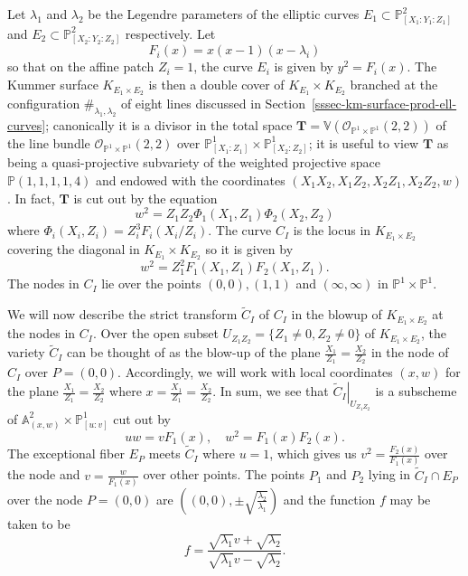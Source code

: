 \documentclass[11pt,a4paper]{article}
\begin{document}
Let $\lambda_1$ and $\lambda_2$ be the Legendre parameters of the elliptic curves $E_1 \subset \mathbb{P}^2_{[X_1:Y_1:Z_1]}$ and $E_2 \subset \mathbb{P}^2_{[X_2:Y_2:Z_2]}$ respectively. Let
\[F_i(x) = x (x - 1)(x- \lambda_i)\]
so that on the affine patch $Z_i = 1$, the curve $E_i$ is given by $y^2 = F_i(x)$. The Kummer surface $K_{E_1 \times E_2}$ is then a double cover of $K_{E_1} \times K_{E_2}$ branched at the configuration $\#_{\lambda_1, \lambda_2}$ of eight lines discussed in Section~\ref{sssec-km-surface-prod-ell-curves}; canonically it is a divisor in the total space $\mathbf{T} = \mathbb{V}(\mathcal{O}_{\mathbb{P}^1 \times \mathbb{P}^1}(2, 2))$ of the line bundle $\mathcal{O}_{\mathbb{P}^1 \times \mathbb{P}^1}(2, 2)$ over $\mathbb{P}^1_{[X_1:Z_1]} \times \mathbb{P}^1_{[X_2:Z_2]}$; it is useful to view $\mathbf{T}$ as being a quasi-projective subvariety of the weighted projective space $\mathbb{P}(1,1,1,1,4)$ and endowed with the coordinates $(X_1X_2, X_1Z_2, X_2Z_1, X_2 Z_2, w)$. In fact, $\mathbf{T}$ is cut out by the equation 
\[w^2 = Z_1Z_2\Phi_1(X_1, Z_1) \Phi_2(X_2, Z_2)\]
 where $\Phi_i(X_i, Z_i) = Z_i^3F_i(X_i/Z_i)$. The curve $C_I$ is the locus in $K_{E_1 \times E_2}$ covering the diagonal in $K_{E_1} \times K_{E_2}$ so it is given by
\[w^2 = Z_1^2F_1(X_1, Z_1) F_2(X_1, Z_1).\]
The nodes in $C_I$ lie over the points $(0, 0), (1, 1)$ and $(\infty, \infty)$ in $\mathbb{P}^1 \times \mathbb{P}^1$.


We will now describe the strict transform $\widetilde{C}_I$ of $C_I$ in the blowup of $K_{E_1 \times E_2}$ at the nodes in $C_I$. %
Over the open subset $U_{Z_1Z_2} = \{Z_1 \neq 0, Z_2 \neq 0\}$ of $K_{E_1 \times E_2}$,  the variety $\widetilde{C}_I$  can be thought of as the blow-up of the plane $\frac{X_1}{Z_1} = \frac{X_2}{Z_2}$ in the node of $C_I$ over $P = (0, 0)$. Accordingly, we will work with local coordinates $(x, w)$ for the plane $\frac{X_1}{Z_1} = \frac{X_2}{Z_2}$ where $x = \frac{X_1}{Z_1} = \frac{X_2}{Z_2}$. In sum, we see that $\left.\widetilde{C}_I\right|_{U_{Z_1Z_2}}$ is a subscheme of $\mathbb{A}^2_{(x, w)} \times \mathbb{P}^1_{[u : v]}$ cut out by 
\[uw = v F_1(x), \quad w^2 = F_1(x) F_2(x).\]
The exceptional fiber $E_P$ meets $\widetilde{C}_I$ where $u = 1$, which gives us $v^2 = \frac{F_2(x)}{F_1(x)}$ over the node and $v = \frac{w}{F_1(x)}$ over other points. The points $P_1$ and $P_2$ lying in $\widetilde{C}_I \cap E_P$ over the node $P = (0, 0)$ are $((0, 0), \pm \sqrt{\frac{\lambda_2}{\lambda_1}})$ and the function $f$ may be taken to be
\[f = \frac{\sqrt{\lambda_1} v + \sqrt{\lambda_2} }{\sqrt{\lambda_1} v - \sqrt{\lambda_2}}.\]
\end{document}
